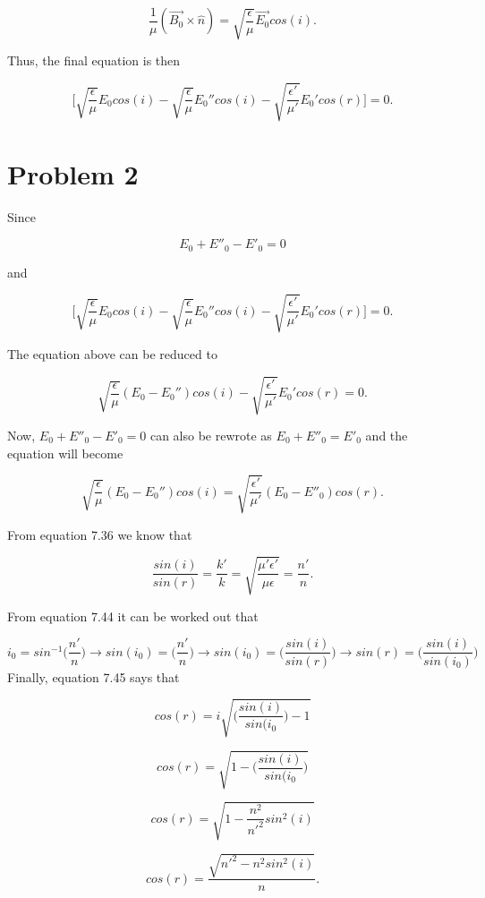 \documentclass[11pt]{article}
\begin{document}
$$
\frac{1}{\mu}(\vec{B_{0}} \times \hat{n}) = \sqrt{\frac{\epsilon}{\mu}}\vec{E_{0}}cos(i).
$$

Thus, the final equation is then 

$$
\Bigg[\sqrt{\frac{\epsilon}{\mu}}E_{0}cos(i) - \sqrt{\frac{\epsilon}{\mu}}E_{0}''cos(i) - 
\sqrt{\frac{\epsilon'}{\mu'}}E_{0}'cos(r)\Bigg] = 0.
$$

\clearpage

\section*{Problem 2}

Since 

$$
E_{0} + E''_{0} - E'_{0} = 0
$$

and 

$$
\Bigg[\sqrt{\frac{\epsilon}{\mu}}E_{0}cos(i) - \sqrt{\frac{\epsilon}{\mu}}E_{0}''cos(i) - 
\sqrt{\frac{\epsilon'}{\mu'}}E_{0}'cos(r)\Bigg] = 0.
$$

The equation above can be reduced to 

$$
\sqrt{\frac{\epsilon}{\mu}}(E_{0} - E_{0}'')cos(i) - 
\sqrt{\frac{\epsilon'}{\mu'}}E_{0}'cos(r) = 0.
$$

Now, $E_{0} + E''_{0} - E'_{0} = 0$ can also be rewrote as $E_{0} + E''_{0} = E'_{0}$ and the equation will become

$$
\sqrt{\frac{\epsilon}{\mu}}(E_{0} - E_{0}'')cos(i) = 
\sqrt{\frac{\epsilon'}{\mu'}}(E_{0} - E''_{0})cos(r).
$$

From equation 7.36 we know that 

$$
\frac{sin(i)}{sin(r)} = \frac{k'}{k} = \sqrt{\frac{\mu'\epsilon'}{\mu\epsilon}} = \frac{n'}{n}.
$$

From equation 7.44 it can be worked out that

$$
i_{0} = sin^{-1}\Bigg(\frac{n'}{n}\Bigg) \rightarrow sin(i_{0}) = \Bigg(\frac{n'}{n}\Bigg) \rightarrow sin(i_{0}) = \Bigg(\frac{sin(i)}{sin(r)}\Bigg) \rightarrow sin(r) = \Bigg(\frac{sin(i)}{sin(i_{0})}\Bigg)
$$
Finally, equation 7.45 says that 

$$
cos(r) = i\sqrt{\Bigg(\frac{sin(i)}{sin(i_{0}}\Bigg) - 1} 
$$

$$
cos(r) = \sqrt{1 - \Bigg(\frac{sin(i)}{sin(i_{0}}\Bigg)} 
$$

$$
cos(r) = \sqrt{1 - \frac{n^{2}}{n'^{2}}sin^{2}(i)} 
$$

$$
cos(r) = \frac{\sqrt{n'^{2} - n^{2}sin^{2}(i)}}{n}.
$$
\end{document}
